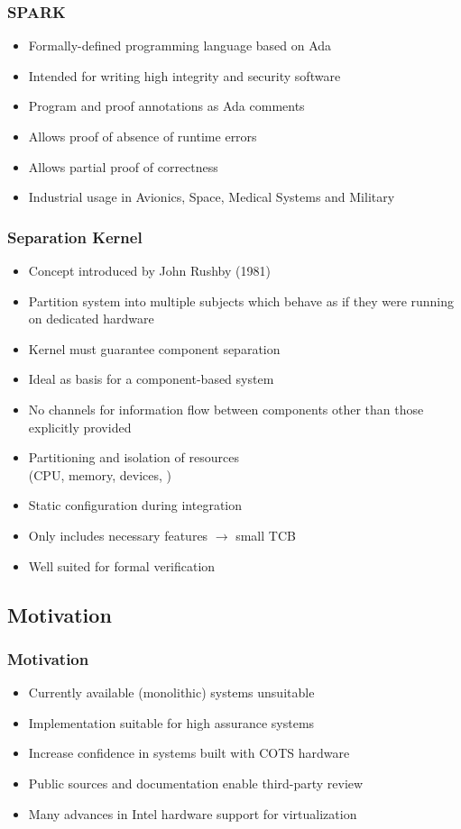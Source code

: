 \documentclass[xcolor={dvipsnames}]{beamer}
\begin{document}
\begin{frame}\frametitle{SPARK}
\begin{itemize}
	\item Formally-defined programming language based on Ada
	\item Intended for writing high integrity and security software
	\item Program and proof annotations as Ada comments
	\item Allows proof of absence of runtime errors
	\item Allows partial proof of correctness
	\item Industrial usage in Avionics, Space, Medical Systems and Military
\end{itemize}


\end{frame}

\begin{frame}\frametitle{Separation Kernel}
\begin{itemize}
	\item Concept introduced by John Rushby (1981)
	\item Partition system into multiple subjects which behave as if they were running on dedicated hardware
	\item Kernel must guarantee component separation
	\item Ideal as basis for a component-based system
	\item No channels for information flow between components other than those explicitly provided
	\item Partitioning and isolation of resources\\(CPU, memory, devices, \textellipsis)
	\item Static configuration during integration
	\item Only includes necessary features $\rightarrow$ small TCB
	\item Well suited for formal verification
\end{itemize}
\end{frame}

\subsection{Motivation}
\begin{frame}\frametitle{Motivation}
\begin{itemize}
	\item Currently available (monolithic) systems unsuitable
	\item Implementation suitable for high assurance systems
	\item Increase confidence in systems built with COTS hardware
	\item Public sources and documentation enable third-party review
	\item Many advances in Intel hardware support for virtualization
\end{itemize}
\end{frame}
\end{document}
